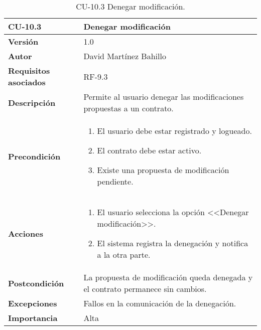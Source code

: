 \begin{table}[p]
	\centering
	\begin{tabularx}{\linewidth}{ p{} p{} }
		\toprule
		\textbf{CU-10.3}  & \textbf{Denegar modificación}\\
		\midrule
		\textbf{Versión}              & 1.0    \\
		\textbf{Autor}                & David Martínez Bahillo \\
		\textbf{Requisitos asociados} & RF-9.3 \\
		\textbf{Descripción}          & Permite al usuario denegar las modificaciones propuestas a un contrato. \\
		\textbf{Precondición}         &  
		\begin{enumerate}
			\item El usuario debe estar registrado y logueado.
			\item El contrato debe estar activo.
			\item Existe una propuesta de modificación pendiente.
		\end{enumerate}\\
		\textbf{Acciones}             &
		\begin{enumerate}
			\item El usuario selecciona la opción <<Denegar modificación>>.
			\item El sistema registra la denegación y notifica a la otra parte.
		\end{enumerate}\\
		\textbf{Postcondición}        & La propuesta de modificación queda denegada y el contrato permanece sin cambios. \\
		\textbf{Excepciones}          & Fallos en la comunicación de la denegación. \\
		\textbf{Importancia}          & Alta \\
		\bottomrule
	\end{tabularx}
	\caption{CU-10.3 Denegar modificación.}
\end{table}


